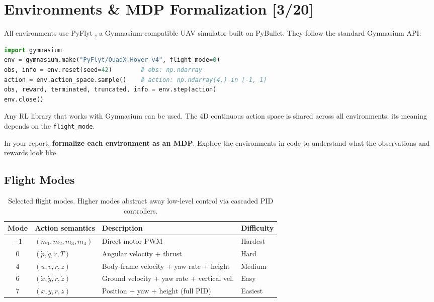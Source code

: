 \documentclass[11pt,a4paper]{article}
\newcommand{\pts}[1]{\hfill{\normalfont\normalsize\color{pts} [#1/20]}}
\begin{document}
\section{Environments \& MDP Formalization\pts{3}}
\label{sec:environments}

All environments use PyFlyt \cite{tai2023pyflyt}, a Gymnasium-compatible UAV simulator built on PyBullet. They follow the standard Gymnasium API:

\begin{lstlisting}[language=Python, numbers=none]
import gymnasium
env = gymnasium.make("PyFlyt/QuadX-Hover-v4", flight_mode=0)
obs, info = env.reset(seed=42)        # obs: np.ndarray
action = env.action_space.sample()    # action: np.ndarray(4,) in [-1, 1]
obs, reward, terminated, truncated, info = env.step(action)
env.close()
\end{lstlisting}

Any RL library that works with Gymnasium can be used. The 4D continuous action space is shared across all environments; its meaning depends on the \texttt{flight\_mode}.

In your report, \textbf{formalize each environment as an MDP}. Explore the environments in code to understand what the observations and rewards look like.

\subsection{Flight Modes}

\begin{table}[H]
\centering
\begin{tabularx}{\textwidth}{clXl}
\toprule
\textbf{Mode} & \textbf{Action semantics} & \textbf{Description} & \textbf{Difficulty} \\
\midrule
$-1$ & $(m_1, m_2, m_3, m_4)$ & Direct motor PWM & Hardest \\
$0$  & $(\dot{p}, \dot{q}, \dot{r}, T)$ & Angular velocity + thrust & Hard \\
$4$  & $(u, v, \dot{r}, z)$ & Body-frame velocity + yaw rate + height & Medium \\
$6$  & $(\dot{x}, \dot{y}, \dot{r}, \dot{z})$ & Ground velocity + yaw rate + vertical vel. & Easy \\
$7$  & $(x, y, r, z)$ & Position + yaw + height (full PID) & Easiest \\
\bottomrule
\end{tabularx}
\caption{Selected flight modes. Higher modes abstract away low-level control via cascaded PID controllers.}
\label{tab:flight_modes}
\end{table}
\end{document}
